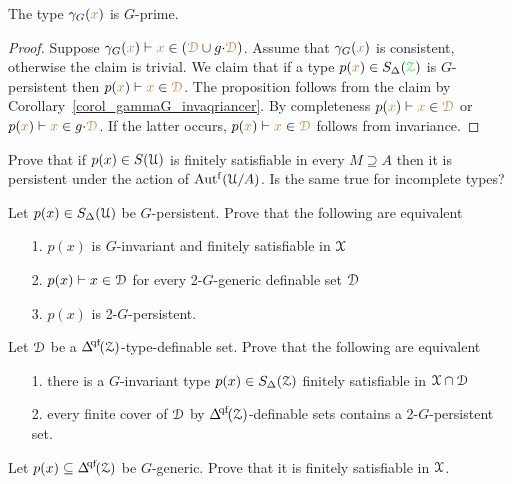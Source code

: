 \begin{proposition}
  The type $\gamma_G({\color{brown} x})$ is $G$-prime.
\end{proposition}

\begin{proof}
  Suppose $\gamma_G({\color{brown} x})\vdash{\color{brown}x}\in({\color{brown}\EuScript D}\cup g{\cdot}{\color{brown}\EuScript D})$.
  Assume that $\gamma_G({\color{brown} x})$ is consistent, otherwise the claim is trivial.
  We claim that if a type $p({\color{brown} x})\in S_\Delta({\color{green}\EuScript Z})$ is $G$-persistent then
  $p({\color{brown} x})\vdash{\color{brown}x}\in{\color{brown}\EuScript D}$.
  The proposition follows from the claim by Corollary~\ref{corol_gammaG_invaqriancer}.
  By completeness $p({\color{brown} x})\vdash{\color{brown}x}\in{\color{brown}\EuScript D}$ or $p({\color{brown} x})\vdash{\color{brown}x}\in g{\cdot}{\color{brown}\EuScript D}$.
  If the latter occurs, $p({\color{brown} x})\vdash{\color{brown}x}\in{\color{brown}\EuScript D}$ follows from invariance.
\end{proof}

\begin{exercise}
  Prove that if $p(x)\in S(\EuScript U)$ is finitely satisfiable in every $M\supseteq A$ then it is persistent under the action of $\mbox{Aut$^{\rm f}$}(\EuScript U/A)$.
  Is the same true for incomplete types?
\end{exercise}

\begin{exercise}
  Let $p(x)\in S_\Delta(\EuScript U)$ be $G$-persistent.
  Prove that the following are equivalent
  \begin{itemize}
    \item[1.] $p(x)$ is $G$-invariant and finitely satisfiable in $\EuScript X$
    \item[2.] $p(x)\vdash x\in\EuScript D$ for every 2-$G$-generic definable set $\EuScript D$
    \item[3.] $p(x)$ is 2-$G$-persistent.
  \end{itemize}
\end{exercise}

\begin{exercise}
  Let $\EuScript D$ be a $\qfDelta({\Z})$-type-definable set.
  Prove that the following are equivalent 
  \begin{itemize}
    \item[1.] there is a $G$-invariant type $p(x)\in S_\Delta(\EuScript Z)$ finitely satisfiable in $\EuScript X\cap\EuScript D$
    \item[2.] every finite cover of $\EuScript D$ by $\qfDelta({\Z})$-definable sets contains a 2-$G$-persistent set.
  \end{itemize}
\end{exercise}

\begin{exercise}\label{ex_gen_sat}
  Let $p(x)\subseteq \qfDelta(\Z)$ be $G$-generic.
  Prove that it is finitely satisfiable in $\EuScript X$.
\end{exercise}


